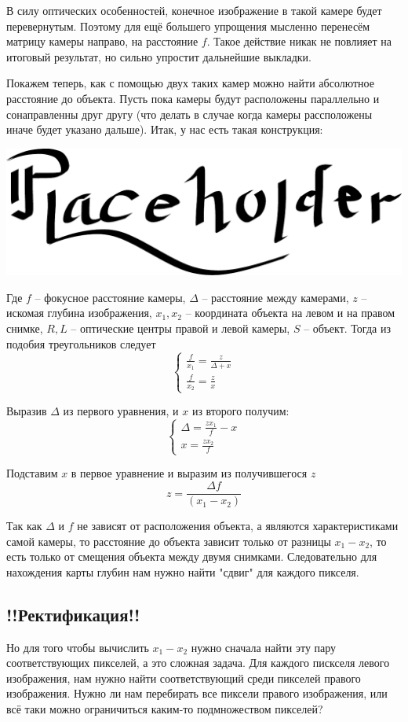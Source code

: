 В силу оптических особенностей, конечное изображение в такой камере будет перевернутым. Поэтому для ещё большего упрощения мысленно перенесём матрицу камеры направо, на расстояние $f$. Такое действие никак не повлияет на итоговый результат, но сильно упростит дальнейшие выкладки.

Покажем теперь, как с помощью двух таких камер можно найти абсолютное расстояние до объекта. Пусть пока камеры будут расположены параллельно и сонаправленны друг другу (что делать в случае когда камеры рассположены иначе будет указано дальше).
Итак, у нас есть такая конструкция:
	
\includegraphics[scale = 0.75]{placeholder}
	
Где $f$ -- фокусное расстояние камеры, $\Delta$ -- расстояние между камерами, $z$ -- искомая глубина изображения, $x_1, x_2$ -- координата объекта на левом и на правом снимке, $R, L$ -- оптические центры правой и левой камеры, $S$ -- объект.
Тогда из подобия треугольников следует 
$$\begin{cases} \frac{f}{x_1} = \frac{z}{\Delta + x} \\ \frac{f}{x_2} = \frac{z}{x} \end{cases}$$
	
Выразив $\Delta$ из первого уравнения, и $x$ из второго получим:
$$\begin{cases} \Delta = \frac{z x_1}{f} - x \\ x = \frac{zx_2}{f} \end{cases}$$
	
Подставим $x$ в первое уравнение и выразим из получившегося $z$
$$ z = \frac{\Delta f}{(x_1 - x_2)}$$
	
	Так как $\Delta$ и $f$ не зависят от расположения объекта, а являются характеристиками самой камеры, то расстояние до объекта зависит только от разницы $x_1 - x_2$, то есть только от смещения объекта между двумя снимками. Следовательно для нахождения карты глубин нам нужно найти "сдвиг" для каждого пикселя.
	
\subsection{!!Ректификация!!}	
	Но для того чтобы вычислить $x_1 - x_2$ нужно сначала найти эту пару соответствующих пикселей, а это сложная задача. Для каждого пискселя левого изображения, нам нужно найти соответствующий среди пикселей правого изображения. Нужно ли нам перебирать все пиксели правого изображения, или всё таки можно ограничиться каким-то подмножеством пикселей?\\
	
